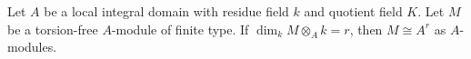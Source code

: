 Let $A$ be a local integral domain with residue field $k$ and quotient field $K$. Let $M$ be a torsion-free $A$-module of finite type. If $\dim_k M \otimes_A k = r$, then $M \cong A^r$ as $A$-modules.
